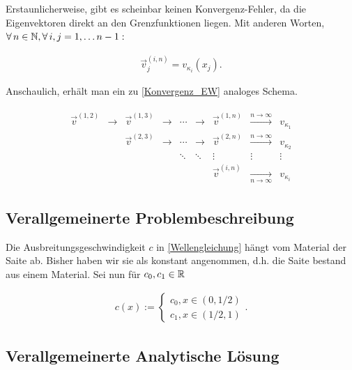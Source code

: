 Erstaunlicherweise, gibt es scheinbar keinen Konvergenz-Fehler, da die Eigenvektoren direkt an den Grenzfunktionen liegen. Mit anderen Worten, $\forall \, n \in \mathbb{N}, \forall \, i, j = 1, \ldots n-1:$

\begin{align*}
  \vec v^{(i, n)}_j = v_{\kappa_i}(x_j).
\end{align*}

Anschaulich, erhält man ein zu \eqref{Konvergenz_EW} analoges Schema.

\begin{align} \label{Konvergenz_EV}
\begin{array}{ccccccccc}
\vec v^{(1, 2)} & \rightarrow & \vec v^{(1, 3)} & \rightarrow & \cdots & \rightarrow & \vec v^{(1, n)} & \xrightarrow{n \to \infty}   & v_{\kappa_1} \\
                &             & \vec v^{(2, 3)} & \rightarrow & \cdots & \rightarrow & \vec v^{(2, n)} & \xrightarrow{n \to \infty}   & v_{\kappa_2} \\
                &             &                 &             & \ddots & \ddots      & \vdots          & \vdots                       & \vdots       \\
                &             &                 &             &        &             & \vec v^{(i, n)} & \xrightarrow[n \to \infty]{} & v_{\kappa_i}
\end{array}
\end{align}

\subsection{Verallgemeinerte Problembeschreibung}

Die Ausbreitungsgeschwindigkeit $c$ in \eqref{Wellengleichung} hängt vom Material der Saite ab. Bisher haben wir sie als konstant angenommen, d.h. die Saite bestand aus einem Material. Sei nun für $c_0, c_1 \in \mathbb{R}$

\begin{align} \label{Material-Funktion}
  c(x) :=
  \begin{cases}
    c_0, x \in (0, 1/2) \\
    c_1, x \in (1/2, 1)
  \end{cases}.
\end{align}

\subsection{Verallgemeinerte Analytische Lösung}

